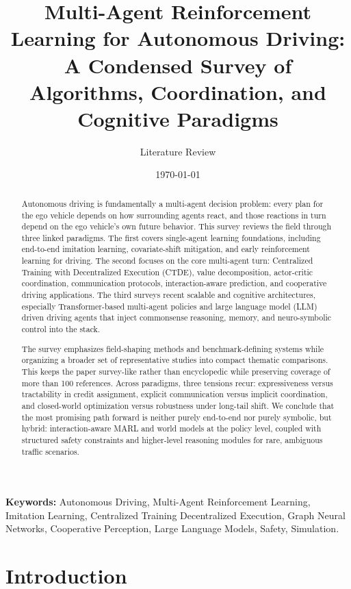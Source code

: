 \documentclass[12pt, a4paper]{article}
\title{\textbf{Multi-Agent Reinforcement Learning for Autonomous Driving:
A Condensed Survey of Algorithms, Coordination, and Cognitive Paradigms}}
\author{\large Literature Review}
\date{\today}
\begin{document}
\maketitle

\begin{abstract}
Autonomous driving is fundamentally a multi-agent decision problem: every plan
for the ego vehicle depends on how surrounding agents react, and those reactions
in turn depend on the ego vehicle's own future behavior. This survey reviews the
field through three linked paradigms. The first covers single-agent learning
foundations, including end-to-end imitation learning, covariate-shift mitigation,
and early reinforcement learning for driving. The second focuses on the core
multi-agent turn: Centralized Training with Decentralized Execution (CTDE),
value decomposition, actor-critic coordination, communication protocols,
interaction-aware prediction, and cooperative driving applications. The third
surveys recent scalable and cognitive architectures, especially Transformer-based
multi-agent policies and large language model (LLM) driven driving agents that
inject commonsense reasoning, memory, and neuro-symbolic control into the stack.

The survey emphasizes field-shaping methods and benchmark-defining systems while
organizing a broader set of representative studies into compact thematic
comparisons. This keeps the paper survey-like rather than encyclopedic while
preserving coverage of more than 100 references. Across paradigms, three
tensions recur: expressiveness versus
tractability in credit assignment, explicit communication versus implicit
coordination, and closed-world optimization versus robustness under long-tail
shift. We conclude that the most promising path forward is neither purely
end-to-end nor purely symbolic, but hybrid: interaction-aware MARL and world
models at the policy level, coupled with structured safety constraints and
higher-level reasoning modules for rare, ambiguous traffic scenarios.
\end{abstract}

\noindent\textbf{Keywords:} Autonomous Driving, Multi-Agent Reinforcement Learning,
Imitation Learning, Centralized Training Decentralized Execution, Graph Neural
Networks, Cooperative Perception, Large Language Models, Safety, Simulation.

\section{Introduction}
\label{sec:intro}
\end{document}
